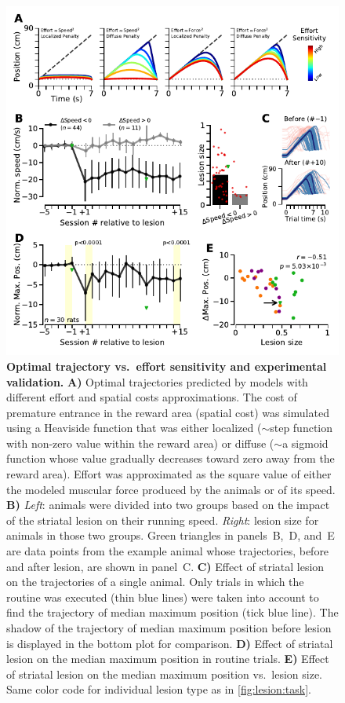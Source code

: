 \begin{figure}[bth!]
	\begin{center}
		\includegraphics[scale=1]{ch-lesion/figures/MaxPosAnalysis.pdf}
		\caption[Optimal Trajectory and Experimental Validation]
		{\textbf{Optimal trajectory vs.\ effort sensitivity and experimental validation.}
		\textbf{A)}
		Optimal trajectories predicted by models with different effort and spatial costs approximations.
		The cost of premature entrance in the reward area (spatial cost) was simulated using a Heaviside function that was either localized ($\sim$step function with non-zero value within the reward area) or diffuse ($\sim$a sigmoid function whose value gradually decreases toward zero away from the reward area).
		Effort was approximated as the square value of either the modeled muscular force produced by the animals or of its speed.
		\textbf{B)}
		\textit{Left}: animals were divided into two groups based on the impact of the striatal lesion on their running speed.
		\textit{Right}: lesion size for animals in those two groups.
		Green triangles in panels~B,~D, and~E are data points from the example animal whose trajectories, before and after lesion, are shown in panel~C.
		\textbf{C)}
		Effect of striatal lesion on the trajectories of a single animal.
		Only trials in which the routine was executed (thin blue lines) were taken into account to find the trajectory of median maximum position (tick blue line).
		The shadow of the trajectory of median maximum position before lesion is displayed in the bottom plot for comparison.
		\textbf{D)}
		Effect of striatal lesion on the median maximum position in routine trials.
		\textbf{E)}
		Effect of striatal lesion on the median maximum position vs.\ lesion size.
		Same color code for individual lesion type as in \autoref{fig:lesion:task}.
		}
		\label{fig:lesion:maxPos}
	\end{center}
\end{figure}